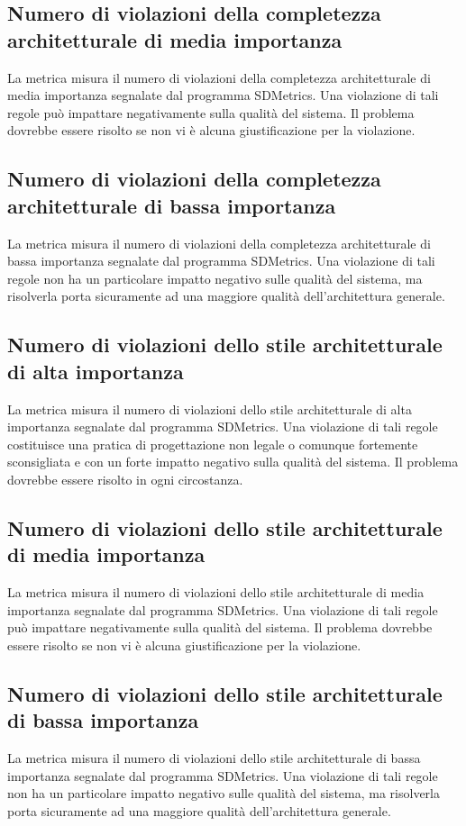 \subsection{Numero di violazioni della completezza architetturale di media importanza}
La metrica misura il numero di violazioni della completezza architetturale di media importanza segnalate dal programma SDMetrics. Una violazione di tali regole può impattare negativamente sulla qualità del sistema. Il problema dovrebbe essere risolto se non vi è alcuna giustificazione per la violazione.



\subsection{Numero di violazioni della completezza architetturale di bassa importanza}
La metrica misura il numero di violazioni della completezza architetturale di bassa importanza segnalate dal programma SDMetrics. Una violazione di tali regole non ha un particolare impatto negativo sulle qualità del sistema, ma risolverla porta sicuramente ad una maggiore qualità dell'architettura generale.

\subsection{Numero di violazioni dello stile architetturale di alta importanza}
La metrica misura il numero di violazioni dello stile architetturale di alta importanza segnalate dal programma SDMetrics. Una violazione di tali regole costituisce una pratica di progettazione non legale o comunque fortemente sconsigliata e con un forte impatto negativo sulla qualità del sistema. Il problema dovrebbe essere risolto in ogni circostanza.

\subsection{Numero di violazioni dello stile architetturale di media importanza}
La metrica misura il numero di violazioni dello stile architetturale di media importanza segnalate dal programma SDMetrics. Una violazione di tali regole può impattare negativamente sulla qualità del sistema. Il problema dovrebbe essere risolto se non vi è alcuna giustificazione per la violazione.

\subsection{Numero di violazioni dello stile architetturale di bassa importanza}
La metrica misura il numero di violazioni dello stile architetturale di bassa importanza segnalate dal programma SDMetrics. Una violazione di tali regole non ha un particolare impatto negativo sulle qualità del sistema, ma risolverla porta sicuramente ad una maggiore qualità dell'architettura generale.

